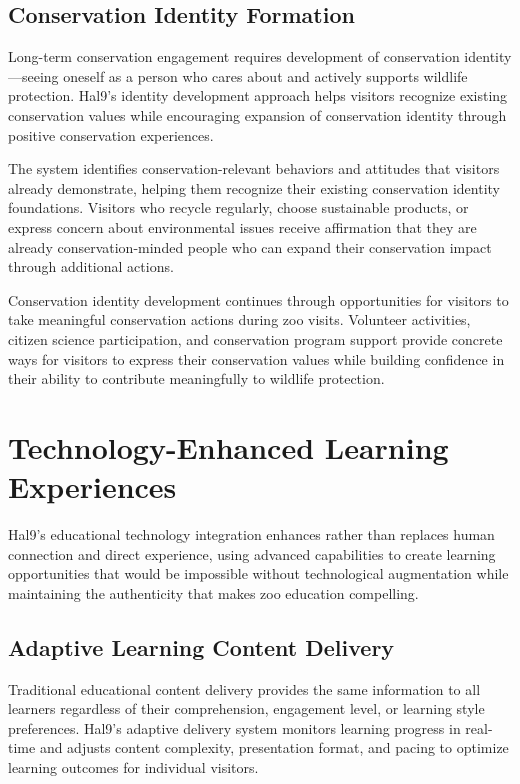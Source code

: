 \documentclass[
  Letterpaper,
]{scrbook}
\begin{document}
\subsection{Conservation Identity
Formation}\label{conservation-identity-formation}

Long-term conservation engagement requires development of conservation
identity---seeing oneself as a person who cares about and actively
supports wildlife protection. Hal9's identity development approach helps
visitors recognize existing conservation values while encouraging
expansion of conservation identity through positive conservation
experiences.

The system identifies conservation-relevant behaviors and attitudes that
visitors already demonstrate, helping them recognize their existing
conservation identity foundations. Visitors who recycle regularly,
choose sustainable products, or express concern about environmental
issues receive affirmation that they are already conservation-minded
people who can expand their conservation impact through additional
actions.

Conservation identity development continues through opportunities for
visitors to take meaningful conservation actions during zoo visits.
Volunteer activities, citizen science participation, and conservation
program support provide concrete ways for visitors to express their
conservation values while building confidence in their ability to
contribute meaningfully to wildlife protection.

\section{Technology-Enhanced Learning
Experiences}\label{technology-enhanced-learning-experiences}

Hal9's educational technology integration enhances rather than replaces
human connection and direct experience, using advanced capabilities to
create learning opportunities that would be impossible without
technological augmentation while maintaining the authenticity that makes
zoo education compelling.

\subsection{Adaptive Learning Content
Delivery}\label{adaptive-learning-content-delivery}

Traditional educational content delivery provides the same information
to all learners regardless of their comprehension, engagement level, or
learning style preferences. Hal9's adaptive delivery system monitors
learning progress in real-time and adjusts content complexity,
presentation format, and pacing to optimize learning outcomes for
individual visitors.
\end{document}
